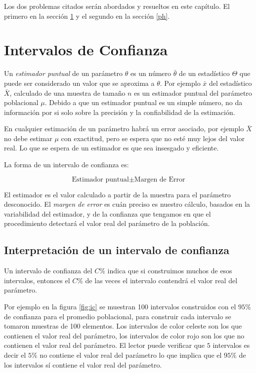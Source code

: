 \documentclass[]{book}
\begin{document}
Los dos problemas citados serán abordados y resueltos en este capítulo. El primero en la sección \ref{ic} y el segundo en la sección \ref{ph}.

\hypertarget{ic}{%
\section{Intervalos de Confianza}\label{ic}}

Un \emph{estimador puntual} de un parámetro \(\theta\) es un número \(\bar{\theta}\) de un estadístico \(\Theta\) que puede ser considerado un valor que se aproxima a \(\theta\). Por ejemplo \(\bar{x}\) del estadístico \(\bar{X}\), calculado de una muestra de tamaño \(n\) es un estimador puntual del parámetro poblacional \(\mu\). Debido a que un estimador puntual es un simple número, no da información por si solo sobre la precisión y la confiabilidad de la estimación.

En cualquier estimación de un parámetro habrá un error asociado, por ejemplo \(\bar{X}\) no debe estimar \(\mu\) con exactitud, pero se espera que no esté muy lejos del valor real. Lo que se espera de un estimador es que sea insesgado y eficiente.

La forma de un intervalo de confianza es:

\begin{equation} 
  \text{Estimador puntual} \pm \text{Margen de Error}
  \label{eq:ic}
\end{equation}

El estimador es el valor calculado a partir de la muestra para el parámetro desconocido. El \emph{margen de error} es cuán preciso es nuestro cálculo, basados en la variabilidad del estimador, y de la confianza que tengamos en que el procedimiento detectará el valor real del parámetro de la población.

\hypertarget{interpretacion-de-un-intervalo-de-confianza}{%
\subsection{Interpretación de un intervalo de confianza}\label{interpretacion-de-un-intervalo-de-confianza}}

Un intervalo de confianza del \(C \%\) indica que si construimos muchos de esos intervalos, entonces el \(C \%\) de las veces el intervalo contendrá el valor real del parámetro.

Por ejemplo en la figura \ref{fig:ic} se muestran 100 intervalos construidos con el \(95 \%\) de confianza para el promedio poblacional, para construir cada intervalo se tomaron muestras de 100 elementos. Los intervalos de color celeste son los que contienen el valor real del parámetro, los intervalos de color rojo son los que no contienen el valor real del parámetro. El lector puede verificar que \(5\) intervalos es decir el \(5 \%\) no contiene el valor real del parámetro lo que implica que el \(95 \%\) de los intervalos sí contiene el valor real del parámetro.
\end{document}
